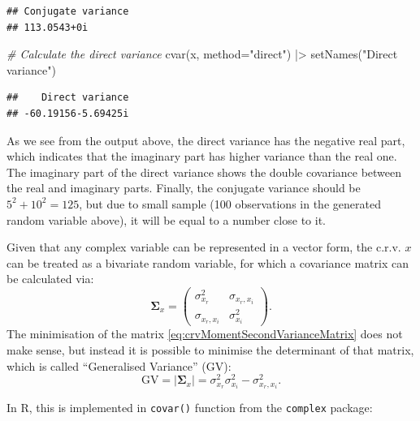 \documentclass[
]{book}
\newenvironment{Shaded}{\begin{snugshade}}{\end{snugshade}}
\newcommand{\AttributeTok}[1]{\textcolor[rgb]{0.77,0.63,0.00}{#1}}
\newcommand{\CommentTok}[1]{\textcolor[rgb]{0.56,0.35,0.01}{\textit{#1}}}
\newcommand{\FunctionTok}[1]{\textcolor[rgb]{0.00,0.00,0.00}{#1}}
\newcommand{\NormalTok}[1]{#1}
\newcommand{\SpecialCharTok}[1]{\textcolor[rgb]{0.00,0.00,0.00}{#1}}
\newcommand{\StringTok}[1]{\textcolor[rgb]{0.31,0.60,0.02}{#1}}
\begin{document}
\begin{verbatim}
## Conjugate variance 
## 113.0543+0i
\end{verbatim}

\begin{Shaded}
\begin{Highlighting}[]
\CommentTok{\# Calculate the direct variance}
\FunctionTok{cvar}\NormalTok{(x, }\AttributeTok{method=}\StringTok{"direct"}\NormalTok{) }\SpecialCharTok{|\textgreater{}}
    \FunctionTok{setNames}\NormalTok{(}\StringTok{"Direct variance"}\NormalTok{)}
\end{Highlighting}
\end{Shaded}

\begin{verbatim}
##    Direct variance 
## -60.19156-5.69425i
\end{verbatim}

As we see from the output above, the direct variance has the negative real part, which indicates that the imaginary part has higher variance than the real one. The imaginary part of the direct variance shows the double covariance between the real and imaginary parts. Finally, the conjugate variance should be \(5^2 + 10^2 = 125\), but due to small sample (100 observations in the generated random variable above), it will be equal to a number close to it.

Given that any complex variable can be represented in a vector form, the c.r.v. \(x\) can be treated as a bivariate random variable, for which a covariance matrix can be calculated via:
\begin{equation}
    \boldsymbol{\Sigma}_x = \begin{pmatrix} \sigma_{x_r}^2 & \sigma_{x_r, x_i} \\ \sigma_{x_r, x_i} & \sigma_{x_i}^2 \end{pmatrix} .
    \label{eq:crvMomentSecondVarianceMatrix}
\end{equation}
The minimisation of the matrix \eqref{eq:crvMomentSecondVarianceMatrix} does not make sense, but instead it is possible to minimise the determinant of that matrix, which is called ``Generalised Variance'' (GV):
\begin{equation}
    \mathrm{GV} = |\boldsymbol{\Sigma}_x| = \sigma_{x_r}^2 \sigma_{x_i}^2 - \sigma_{x_r, x_i}^2 .
    \label{eq:crvMomentSecondGV}
\end{equation}

In R, this is implemented in \texttt{covar()} function from the \texttt{complex} package:
\end{document}
